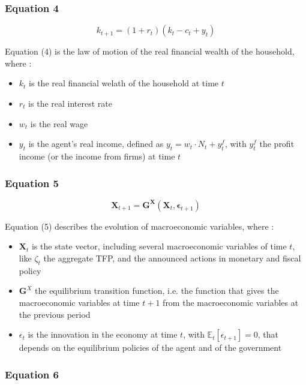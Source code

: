 \documentclass{article}
\begin{document}

\subsubsection*{Equation 4}
\begin{equation}
    k_{t+1}=(1+r_t)(k_{t}-c_{t}+y_{t})
\end{equation}

Equation (4) is the law of motion of the real financial wealth of the household, where : 
\begin{itemize}
    \item $k_t$ is the real financial welath of the household at time $t$
    \item $r_t$ is the real interest rate
    \item $w_t$ is the real wage
    \item $y_t$ is the agent's real income, defined as $y_t=w_t\cdot N_{t}+y_{t}^{f}$, with $y_{t}^{f}$ the profit income (or the income from firms) at time $t$
\end{itemize}

\subsubsection*{Equation 5}

\begin{equation}
    \bm{X}_{t+1}=\bm{G}^{\bm{X}}\left(\bm{X}_{t},\bm{\epsilon}_{t+1}\right)
\end{equation}

Equation (5) describes the evolution of macroeconomic variables, where : 
\begin{itemize}
    \item $\bm{X}_t$ is the state vector, including several macroeconomic variables of time $t$, like $\zeta_t$ the aggregate TFP, and the announced actions in monetary and fiscal policy
    \item $\bm{G}^X$ the equilibrium transition function, i.e. the function that gives the macroeconomic variables at time $t+1$ from the macroeconomic variables at the previous period
    \item $\epsilon_{t}$ is the innovation in the economy at time $t$, with $\mathbb{E}_{t}\left[\epsilon_{t+1}\right]=0$, that depends on the equilibrium policies of the agent and of the government
\end{itemize}

\subsubsection*{Equation 6}
\end{document}
